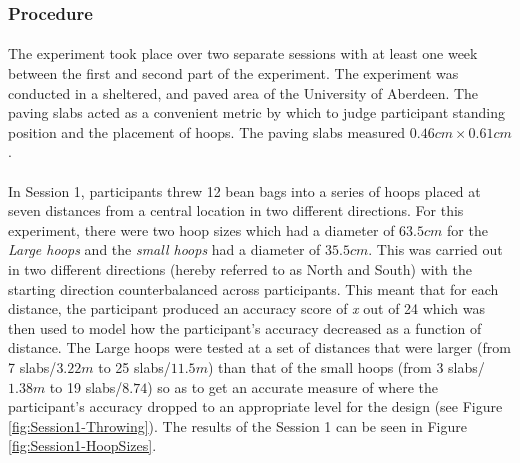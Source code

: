 \documentclass[12pt]{article}
\begin{document}
\subsubsection*{Procedure}
\paragraph{} The experiment took place over two separate sessions with at least one week between the first and second part of the experiment. The experiment was conducted in a sheltered, and paved area of the University of Aberdeen. The paving slabs acted as a convenient metric by which to judge participant standing position and the placement of hoops. The paving slabs measured $0.46cm \times 0.61cm$.

\paragraph{} In Session 1, participants threw 12 bean bags into a series of hoops placed at seven distances from a central location in two different directions. For this experiment, there were two hoop sizes which had a diameter of $63.5cm$ for the \textit{Large hoops} and the \textit{small hoops} had a diameter of $35.5cm$. This was carried out in two different directions (hereby referred to as North and South) with the starting direction counterbalanced across participants. This meant that for each distance, the participant produced an accuracy score of \textit{x} out of 24 which was then used to model how the participant's accuracy decreased as a function of distance. The Large hoops were tested at a set of distances that were larger (from 7 slabs/$3.22m$ to 25 slabs/$11.5m$) than that of the small hoops (from 3 slabs/$1.38m$ to 19 slabs/$8.74$) so as to get an accurate measure of where the participant's accuracy dropped to an appropriate level for the design (see Figure \ref{fig:Session1-Throwing}). The results of the Session 1 can be seen in Figure \ref{fig:Session1-HoopSizes}.
\end{document}
